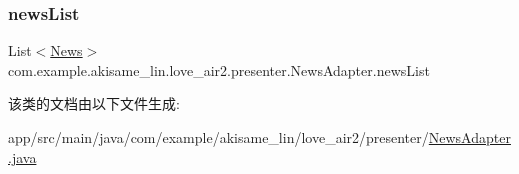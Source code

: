 \subsubsection{\texorpdfstring{newsList}{newsList}}
{\footnotesize\ttfamily List$<$\mbox{\hyperlink{classcom_1_1example_1_1akisame__lin_1_1love__air2_1_1_bean_1_1_news}{News}}$>$ com.\+example.\+akisame\+\_\+lin.\+love\+\_\+air2.\+presenter.\+News\+Adapter.\+news\+List\hspace{0.3cm}{\ttfamily [private]}}



该类的文档由以下文件生成\+:\begin{DoxyCompactItemize}
\item 
app/src/main/java/com/example/akisame\+\_\+lin/love\+\_\+air2/presenter/\mbox{\hyperlink{_news_adapter_8java}{News\+Adapter.\+java}}\end{DoxyCompactItemize}
